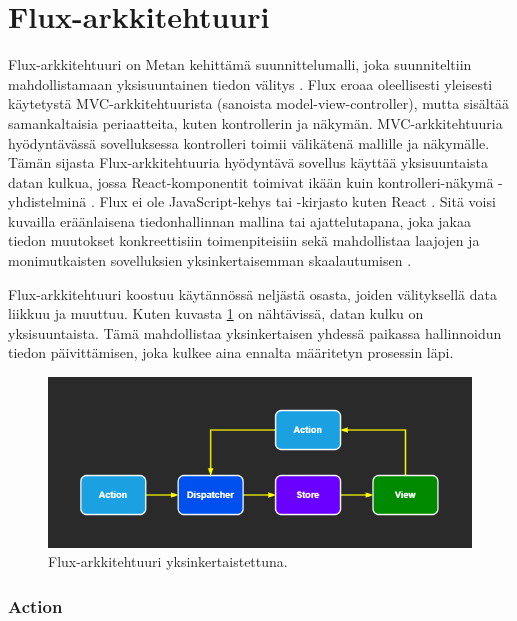 \section{Flux-arkkitehtuuri}
\label{Flux-arkkitehtuuri}

Flux-arkkitehtuuri on Metan kehittämä suunnittelumalli, joka suunniteltiin mahdollistamaan yksisuuntainen tiedon välitys \cite[174]{learningreact}. Flux eroaa oleellisesti yleisesti käytetystä MVC-arkkitehtuurista (sanoista model-view-controller), mutta sisältää samankaltaisia periaatteita, kuten kontrollerin ja näkymän. MVC-arkkitehtuuria hyödyntävässä sovelluksessa kontrolleri toimii välikätenä mallille ja näkymälle. Tämän sijasta Flux-arkkitehtuuria hyödyntävä sovellus käyttää yksisuuntaista datan kulkua, jossa React-komponentit toimivat ikään kuin kontrolleri-näkymä -yhdistelminä \cite{facebookflux} \cite[174]{learningreact} \cite{flux2}. Flux ei ole JavaScript-kehys tai -kirjasto kuten React \cite[5]{flux}. Sitä voisi kuvailla eräänlaisena tiedonhallinnan mallina tai ajattelutapana, joka jakaa tiedon muutokset konkreettisiin toimenpiteisiin sekä mahdollistaa laajojen ja monimutkaisten sovelluksien yksinkertaisemman skaalautumisen \cite[6]{flux}.

Flux-arkkitehtuuri koostuu käytännössä neljästä osasta, joiden välityksellä data liikkuu ja muuttuu. Kuten kuvasta \ref{fig:flux1} on nähtävissä, datan kulku on yksisuuntaista. Tämä mahdollistaa yksinkertaisen yhdessä paikassa hallinnoidun tiedon päivittämisen, joka kulkee aina ennalta määritetyn prosessin läpi.

\begin{figure}[h]
\centering \includegraphics[width=1\textwidth]{kuvat/Flux3.png}
\caption{Flux-arkkitehtuuri yksinkertaistettuna. \cite{facebookflux}}
\label{fig:flux1} 
\end{figure}


\subsubsection{Action}
\label{Action}

